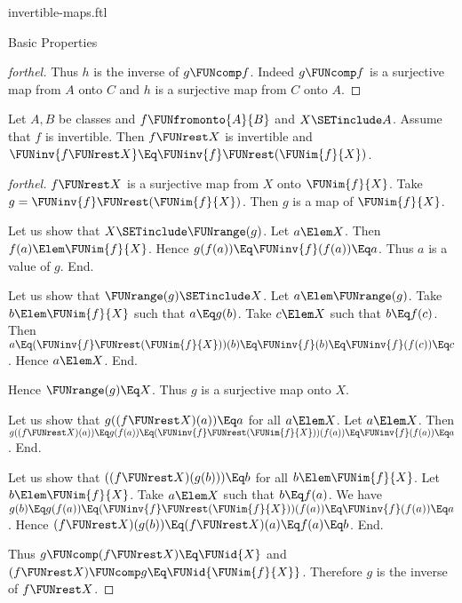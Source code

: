 \documentclass{stex}
\begin{document}
\begin{smodule}{invertible-maps.ftl}
\begin{sfragment}{Basic Properties}
\begin{proof}[forthel]
    Thus $h$ is the inverse of $g \FUNcomp f$.
    Indeed $g \FUNcomp f$ is a surjective map from $A$ onto $C$ and $h$ is a surjective map from $C$ onto $A$.
  \end{proof}

  \begin{proposition}[forthel,id=FOUNDATIONS_09_6374884963778560]
    Let $A, B$ be classes and $f \FUNfromonto{A}{B}$ and $X \SETinclude A$.
    Assume that $f$ is invertible.
    Then $f \FUNrest X$ is invertible and $\FUNinv{f\FUNrest X} \Eq \FUNinv{f} \FUNrest (\FUNim{f}{X})$.
  \end{proposition}
  \begin{proof}[forthel]
    $f \FUNrest X$ is a surjective map from $X$ onto $\FUNim{f}{X}$.
    Take $g = \FUNinv{f} \FUNrest (\FUNim{f}{X})$.
    Then $g$ is a map of $\FUNim{f}{X}$.

    Let us show that $X \SETinclude \FUNrange(g)$.
      Let $a \Elem X$.
      Then $f(a) \Elem \FUNim{f}{X}$.
      Hence $g(f(a)) \Eq \FUNinv{f}(f(a)) \Eq a$.
      Thus $a$ is a value of $g$.
    End.

    Let us show that $\FUNrange(g) \SETinclude X$.
      Let $a \Elem \FUNrange(g)$.
      Take $b \Elem \FUNim{f}{X}$ such that $a \Eq g(b)$.
      Take $c \Elem X$ such that $b \Eq f(c)$.
      Then $a
        \Eq (\FUNinv{f} \FUNrest (\FUNim{f}{X}))(b)
        \Eq \FUNinv{f}(b)
        \Eq \FUNinv{f}(f(c))
        \Eq c$.
      Hence $a \Elem X$.
    End.

    Hence $\FUNrange(g) \Eq X$.
    Thus $g$ is a surjective map onto $X$.

    Let us show that $g((f \FUNrest X)(a)) \Eq a$ for all $a \Elem X$.
      Let $a \Elem X$.
      Then $g((f \FUNrest X)(a))
        \Eq g(f(a))
        \Eq (\FUNinv{f} \FUNrest (\FUNim{f}{X}))(f(a))
        \Eq \FUNinv{f}(f(a))
        \Eq a$.
    End.

    Let us show that $((f \FUNrest X)(g(b))) \Eq b$ for all $b \Elem \FUNim{f}{X}$.
      Let $b \Elem \FUNim{f}{X}$.
      Take $a \Elem X$ such that $b \Eq f(a)$.
      We have $g(b)
        \Eq g(f(a))
        \Eq (\FUNinv{f} \FUNrest (\FUNim{f}{X}))(f(a))
        \Eq \FUNinv{f}(f(a))
        \Eq a$.
      Hence $(f \FUNrest X)(g(b))
        \Eq (f \FUNrest X)(a)
        \Eq f(a)
        \Eq b$.
    End.

    Thus $g \FUNcomp (f \FUNrest X) \Eq \FUNid{X}$ and $(f \FUNrest X) \FUNcomp g \Eq \FUNid{\FUNim{f}{X}}$.
    Therefore $g$ is the inverse of $f \FUNrest X$.
  \end{proof}


\end{sfragment}
\end{smodule}
\end{document}
